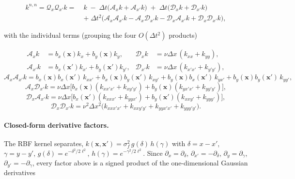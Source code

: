 \documentclass[11pt]{article}
\newcommand{\bx}{\mathbf{x}}
\newcommand{\Qop}{\mathcal{Q}}
\newcommand{\Aop}{\mathcal{A}}
\newcommand{\Dop}{\mathcal{D}}
\begin{document}
\begin{equation}
  \label{eq:knn-full}
  \begin{aligned}
  k^{n,n}=\Qop_x\Qop_{x'}k
  =\;& k
   \;-\;\Delta t\bigl(\Aop_x k+\Aop_{x'}k\bigr)
   \;+\;\Delta t\bigl(\Dop_x k+\Dop_{x'}k\bigr)\\
  &+\;\Delta t^{2}\bigl(\Aop_x\Aop_{x'}k-\Aop_x\Dop_{x'}k-\Dop_x\Aop_{x'}k+\Dop_x\Dop_{x'}k\bigr),
  \end{aligned}
\end{equation}

with the individual terms (grouping the four $O(\Delta t^2)$ products)

\begin{equation}
  \label{eq:terms-first}
  \begin{aligned}
  \Aop_x k &= b_x(\bx)k_x+b_y(\bx)k_y, &
  \Dop_x k &= \nu\Delta x\,(k_{xx}+k_{yy}),\\
  \Aop_{x'} k &= b_x(\bx')k_{x'}+b_y(\bx')k_{y'}, &
  \Dop_{x'} k &= \nu\Delta x\,(k_{x'x'}+k_{y'y'}),
  \end{aligned}
\end{equation}
\begin{equation}
  \label{eq:terms-AA}
  \Aop_x\Aop_{x'}k=
  b_x(\bx)b_x(\bx')\,k_{xx'}
  +b_x(\bx)b_y(\bx')\,k_{xy'}
  +b_y(\bx)b_x(\bx')\,k_{yx'}
  +b_y(\bx)b_y(\bx')\,k_{yy'},
\end{equation}
\begin{equation}
  \label{eq:terms-AD}
  \Aop_x\Dop_{x'}k=\nu\Delta x\bigl[
  b_x(\bx)(k_{xx'x'}+k_{xy'y'})
  +b_y(\bx)(k_{yx'x'}+k_{yy'y'})\bigr],
\end{equation}
\begin{equation}
  \label{eq:terms-DA}
  \Dop_x\Aop_{x'}k=\nu\Delta x\bigl[
  b_x(\bx')(k_{xxx'}+k_{yyx'})
  +b_y(\bx')(k_{xxy'}+k_{yyy'})\bigr],
\end{equation}
\begin{equation}
  \label{eq:terms-DD}
  \Dop_x\Dop_{x'}k=\nu^{2}\Delta x^{2}\bigl(
  k_{xxx'x'}+k_{xxy'y'}+k_{yyx'x'}+k_{yyy'y'}\bigr).
\end{equation}

\paragraph{Closed-form derivative factors.}
The RBF kernel separates, $k(\bx,\bx')=\sigma_f^{2}\,g(\delta)\,h(\gamma)$ with
$\delta=x-x'$, $\gamma=y-y'$, $g(\delta)=e^{-\delta^{2}/2\ell^{2}}$,
$h(\gamma)=e^{-\gamma^{2}/2\ell^{2}}$. Since $\partial_x=\partial_\delta$,
$\partial_{x'}=-\partial_\delta$, $\partial_y=\partial_\gamma$,
$\partial_{y'}=-\partial_\gamma$, every factor above is a signed product of the
one-dimensional Gaussian derivatives
\end{document}
